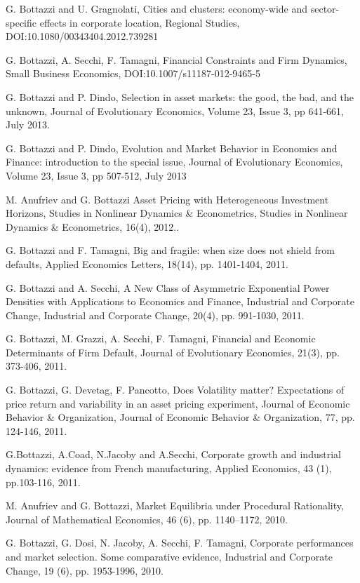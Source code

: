 \documentclass[a4paper]{article}
\begin{document}
G. Bottazzi and U. Gragnolati, Cities and clusters: economy-wide and
sector-specific effects in corporate location, Regional Studies,
DOI:10.1080/00343404.2012.739281

G. Bottazzi, A. Secchi, F. Tamagni, Financial Constraints and Firm
Dynamics, Small Business Economics, DOI:10.1007/s11187-012-9465-5

G. Bottazzi and P. Dindo, Selection in asset markets: the good, the
bad, and the unknown, Journal of Evolutionary Economics, Volume 23,
Issue 3, pp 641-661, July 2013.

G. Bottazzi and P. Dindo, Evolution and Market Behavior in Economics
and Finance: introduction to the special issue, Journal of
Evolutionary Economics, Volume 23, Issue 3, pp 507-512, July 2013

M. Anufriev and G. Bottazzi Asset Pricing with Heterogeneous
Investment Horizons, Studies in Nonlinear Dynamics \& Econometrics,
Studies in Nonlinear Dynamics \& Econometrics, 16(4), 2012..

G. Bottazzi and F. Tamagni, Big and fragile: when size does not shield
from defaults, Applied Economics Letters, 18(14), pp. 1401-1404, 2011.

G. Bottazzi and A. Secchi, A New Class of Asymmetric Exponential Power
Densities with Applications to Economics and Finance, Industrial and
Corporate Change, Industrial and Corporate Change, 20(4),
pp. 991-1030, 2011.

G. Bottazzi, M. Grazzi, A. Secchi, F. Tamagni, Financial and Economic
Determinants of Firm Default, Journal of Evolutionary Economics,
21(3), pp. 373-406, 2011.

G. Bottazzi, G. Devetag, F. Pancotto, Does Volatility matter?
Expectations of price return and variability in an asset pricing
experiment, Journal of Economic Behavior \& Organization, Journal of
Economic Behavior \& Organization, 77, pp. 124-146, 2011.

G.Bottazzi, A.Coad, N.Jacoby and A.Secchi, Corporate growth and
industrial dynamics: evidence from French manufacturing, Applied
Economics, 43 (1), pp.103-116, 2011.

M. Anufriev and G. Bottazzi, Market Equilibria under Procedural
Rationality, Journal of Mathematical Economics, 46 (6), pp. 1140–1172,
2010.

G. Bottazzi, G. Dosi, N. Jacoby, A. Secchi, F. Tamagni, Corporate
performances and market selection. Some comparative evidence,
Industrial and Corporate Change, 19 (6), pp. 1953-1996, 2010.
\end{document}
